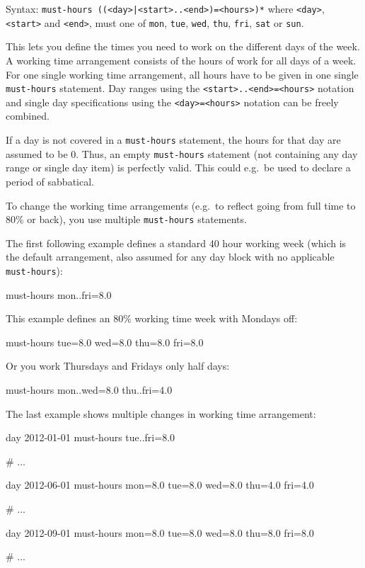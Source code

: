 \documentclass[11pt]{article}
\begin{document}
Syntax: \verb:must-hours ((<day>|<start>..<end>)=<hours>)*: where \verb:<day>:, \verb:<start>: and \verb:<end>:, must one of \verb:mon:, \verb:tue:, \verb:wed:, \verb:thu:, \verb:fri:, \verb:sat: or \verb:sun:.

This lets you define the times you need to work on the different days of the week. A working time arrangement consists of the hours of work for all days of a week. For one single working time arrangement, all hours have to be given in one single \verb:must-hours: statement. Day ranges using the \verb:<start>..<end>=<hours>: notation and single day specifications using the \verb:<day>=<hours>: notation can be freely combined.

If a day is not covered in a \verb:must-hours: statement, the hours for that day are assumed to be 0. Thus, an empty \verb:must-hours: statement (not containing any day range or single day item) is perfectly valid. This could e.g.\ be used to declare a period of sabbatical.

To change the working time arrangements (e.g.\ to reflect going from full time to 80\% or back), you use multiple \verb:must-hours: statements.

The first following example defines a standard 40 hour working week (which is the default arrangement, also assumed for any day block with no applicable \verb:must-hours:):
\begin{inputfile}
must-hours mon..fri=8.0
\end{inputfile}

This example defines an 80\% working time week with Mondays off:
\begin{inputfile}
must-hours tue=8.0 wed=8.0 thu=8.0 fri=8.0
\end{inputfile}

Or you work Thursdays and Fridays only half days:
\begin{inputfile}
must-hours mon..wed=8.0 thu..fri=4.0
\end{inputfile}

The last example shows multiple changes in working time arrangement: 
\begin{inputfile}
day 2012-01-01
must-hours tue..fri=8.0

# ...

day 2012-06-01
must-hours mon=8.0 tue=8.0 wed=8.0 thu=4.0 fri=4.0

# ...

day 2012-09-01
must-hours mon=8.0 tue=8.0 wed=8.0 thu=8.0 fri=8.0

# ...
\end{inputfile}
\end{document}
